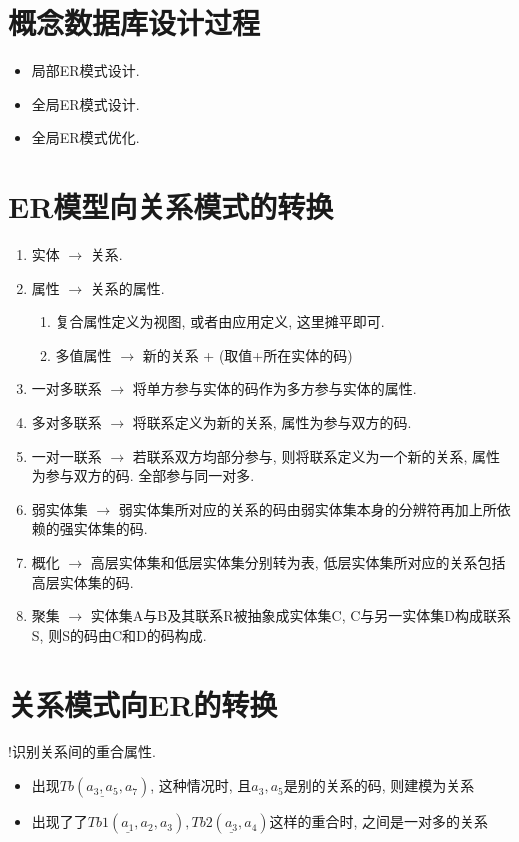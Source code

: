 \section{概念数据库设计过程}

\begin{itemize}
    \item 局部ER模式设计.
    \item 全局ER模式设计.
    \item 全局ER模式优化.
\end{itemize}

\section{ER模型向关系模式的转换}

\begin{enumerate}
    \item 实体 $\to$ 关系.
    \item 属性 $\to$ 关系的属性.
    \begin{enumerate}
        \item 复合属性定义为视图, 或者由应用定义, 这里摊平即可.
        \item 多值属性 $\to$ 新的关系 + (取值+所在实体的码)
    \end{enumerate}
    \item 一对多联系 $\to$ 将单方参与实体的码作为多方参与实体的属性.
    \item 多对多联系 $\to$ 将联系定义为新的关系, 属性为参与双方的码.
    \item 一对一联系 $\to$ 若联系双方均部分参与, 则将联系定义为一个新的关系, 属性为参与双方的码. 全部参与同一对多.
    \item 弱实体集 $\to$ 弱实体集所对应的关系的码由弱实体集本身的分辨符再加上所依赖的强实体集的码.
    \item 概化 $\to$ 高层实体集和低层实体集分别转为表, 低层实体集所对应的关系包括高层实体集的码.
    \item 聚集 $\to$ 实体集A与B及其联系R被抽象成实体集C, C与另一实体集D构成联系S, 则S的码由C和D的码构成.
\end{enumerate}

\section{关系模式向ER的转换}

!识别关系间的重合属性.

\begin{itemize}
    \item 出现$Tb(\underline{a_3, a_5},a_7)$, 这种情况时, 且$a_3, a_5$是别的关系的码, 则建模为关系
    \item 出现了了$Tb1(\underline{a_1},a_2,a_3), Tb2(\underline{a_3}, a_4)$这样的重合时, 之间是一对多的关系
\end{itemize}

